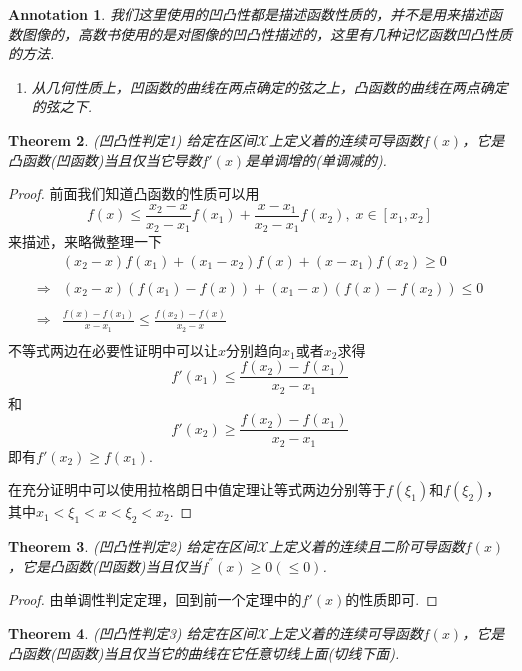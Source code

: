 \documentclass{article}
\newtheorem{theorem}{Theorem}[section]
\newtheorem{annotation}[theorem]{Annotation}
\begin{document}
\begin{annotation}
\rm 我们这里使用的凹凸性都是描述函数性质的，并不是用来描述函数图像的，{\color{red}高数书使用的是对图像的凹凸性描述的}，这里有几种记忆函数凹凸性质的方法.
\begin{enumerate}
	\item 从几何性质上，凹函数的曲线在两点确定的弦之上，凸函数的曲线在两点确定的弦之下.
\end{enumerate}	
\end{annotation}

\begin{theorem}
\rm {\color{red} (凹凸性判定1)} 给定在区间$\mathcal{X}$上定义着的连续可导函数$f(x)$，它是凸函数(凹函数)当且仅当它导数$f'(x)$是单调增的(单调减的). 
\end{theorem}

\begin{proof}
前面我们知道凸函数的性质可以用
$$
f(x) \leq \frac{x_2 - x}{x_2-x_1}f(x_1) + \frac{x-x_1}{x_2-x_1}f(x_2),\; x \in [x_1,x_2]
$$
来描述，来略微整理一下
$$
\begin{array}{ll}
&(x_2-x)f(x_1) + (x_1-x_2)f(x) + (x-x_1)f(x_2) \geq 0 \\ \\
\Rightarrow & (x_2 - x)(f(x_1)-f(x)) + (x_1 -x)(f(x)-f(x_2)) \leq  0 \\ \\
\Rightarrow & \frac{f(x) - f(x_1)}{x -x_1} \leq \frac{f(x_2) - f(x)}{x_2 - x} \\
\end{array}
$$
不等式两边在必要性证明中可以让$x$分别趋向$x_1$或者$x_2$求得
$$
f'(x_1) \leq \frac{f(x_2) - f(x_1)}{x_2 - x_1}
$$
和 
$$
f'(x_2) \geq \frac{f(x_2) - f(x_1)}{x_2 - x_1} 
$$
即有$f'(x_2) \geq f(x_1)$.

在充分证明中可以使用拉格朗日中值定理让等式两边分别等于$f(\xi_1)$和$f(\xi_2)$，其中$x_1 < \xi_1 < x < \xi_2 < x_2$.
\end{proof}


\begin{theorem}
\rm {\color{red} (凹凸性判定2)} 给定在区间$\mathcal{X}$上定义着的连续且二阶可导函数$f(x)$，它是凸函数(凹函数)当且仅当$f^{''}(x) \geq 0(\leq 0)$.
\end{theorem}

\begin{proof}
由单调性判定定理，回到前一个定理中的$f'(x)$的性质即可.
\end{proof}

\begin{theorem}
\rm {\color{red} (凹凸性判定3)} 给定在区间$\mathcal{X}$上定义着的连续可导函数$f(x)$，它是凸函数(凹函数)当且仅当它的曲线在它任意切线上面(切线下面).
\end{theorem}
\end{document}
